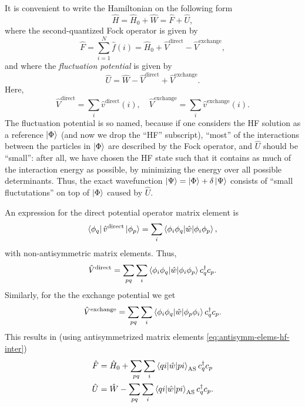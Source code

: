 \documentclass{report}
\theoremstyle{plain}
\theoremstyle{definition}
\begin{document}
It is convenient to write the Hamiltonian on the following form
\begin{equation}
  \hat{H} = \hat{H}_0 + \hat{W} = \hat{F} + \hat{U},
\end{equation}
where the second-quantized Fock operator is given by
\begin{equation}
  \hat{F} = \sum_{i=1}^N \hat{f}(i) = \hat{H}_0 +
  \hat{V}^\text{direct} - \hat{V}^\text{exchange},
\end{equation}
and where the \emph{fluctuation potential} is given by
\begin{equation}
  \hat{U} = \hat{W} - \hat{V}^\text{direct} + \hat{V}^\text{exchange}.
\end{equation}
Here,
\begin{equation}
  \hat{V}^\text{direct} = \sum_i \hat{v}^\text{direct}(i), \quad
  \hat{V}^\text{exchange} = \sum_i \hat{v}^\text{exchange}(i). 
\end{equation}
The fluctuation potential is so named, because if one considers the HF
solution as a reference $\ket{\Phi}$ (and now we drop the ``HF''
subscript), ``most'' of the interactions between the particles in
$\ket{\Phi}$ are described by the Fock operator, and
$\hat{U}$ should be ``small'': after all, we have chosen the HF state
such that it contains as much of the interaction energy as possible,
by minimizing the energy over all possible determinants. Thus,  the exact wavefunction
$\ket{\Psi} = \ket{\Phi} + \delta\ket{\Psi}$ consists of
``small fluctutations'' on top of $\ket{\Phi}$ caused by $\hat{U}$.

An expression for the direct potential operator matrix element is
\begin{equation}
  \bra{\phi_q} \hat{v}^\text{direct} \ket{\phi_p} = \sum_{i}
  \braket{\phi_i\phi_q|\hat{w}|\phi_i \phi_p},
\end{equation}
with non-antisymmetric matrix elements. Thus,
\begin{equation}
  \hat{V}^\text{direct} = \sum_{pq} \sum_{i}
  \braket{\phi_i\phi_q|\hat{w}|\phi_i \phi_p} c^\dag_q c_p.
\end{equation}
Similarly, for the the exchange potential we get
\begin{equation}
  \hat{V}^\text{exchange} = \sum_{pq} \sum_{i}
  \braket{\phi_i\phi_q|\hat{w}|\phi_p\phi_i} c^\dag_q c_p.
\end{equation}
This results in (using antisymmetrized matrix elements \eqref{eq:antisymm-elems-hf-inter})
\begin{align}
  \hat{F} &= \hat{H}_0 + \sum_{pq}\sum_i \braket{qi|\hat{w}|pi}_\text{AS}
  c^\dag_q c_p \\
  \hat{U} &= \hat{W} - \sum_{pq}\sum_i \braket{qi|\hat{w}|pi}_\text{AS}
  c^\dag_q c_p.  
\end{align}
\end{document}
